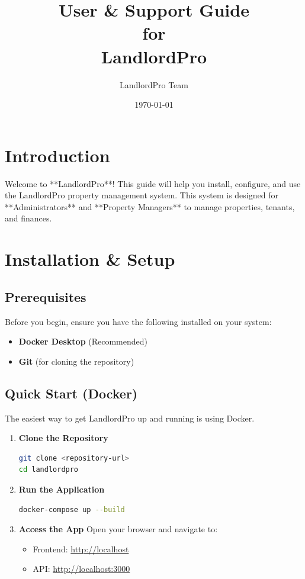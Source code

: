 \documentclass[12pt,a4paper]{article}
\title{\textcolor{brandTeal}{\textbf{User \& Support Guide}}\\for\\LandlordPro}
\author{LandlordPro Team}
\date{\today}
\begin{document}
\maketitle
\thispagestyle{empty}
\newpage

\tableofcontents
\newpage

\section{Introduction}
Welcome to **LandlordPro**! This guide will help you install, configure, and use the LandlordPro property management system. This system is designed for **Administrators** and **Property Managers** to manage properties, tenants, and finances.

\section{Installation \& Setup}

\subsection{Prerequisites}
Before you begin, ensure you have the following installed on your system:
\begin{itemize}
    \item \textbf{Docker Desktop} (Recommended)
    \item \textbf{Git} (for cloning the repository)
\end{itemize}

\subsection{Quick Start (Docker)}
The easiest way to get LandlordPro up and running is using Docker.

\begin{enumerate}
    \item \textbf{Clone the Repository}
    \begin{lstlisting}[language=bash]
git clone <repository-url>
cd landlordpro
    \end{lstlisting}

    \item \textbf{Run the Application}
    \begin{lstlisting}[language=bash]
docker-compose up --build
    \end{lstlisting}

    \item \textbf{Access the App}
    Open your browser and navigate to:
    \begin{itemize}
        \item Frontend: \url{http://localhost}
        \item API: \url{http://localhost:3000}
    \end{itemize}
\end{enumerate}
\end{document}
